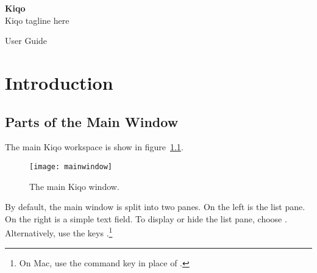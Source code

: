 \documentclass[11pt,fleqn]{book} %
\begin{document}

\begingroup
\thispagestyle{empty}
\centering
\vspace*{5cm}
\par\normalfont\fontsize{35}{35}\sffamily\selectfont
\textbf{Kiqo}\\
{\LARGE Kiqo tagline here}\par %
\vspace*{1cm}
{\Huge User Guide}\par %
\endgroup


\thispagestyle{empty}
\tableofcontents %


\chapter{Introduction}
\thispagestyle{empty}

\section{Parts of the Main Window}
The main Kiqo workspace is show in figure~\ref{fig:mainwindow}.

\begin{figure}[h]
  \centering
  \texttt{[image: mainwindow]}
  \caption{The main Kiqo window.\label{fig:mainwindow}}
\end{figure}

By default, the main window is split into two panes.
On the left is the list pane.
On the right is a simple text field.
To display or hide the list pane, choose .
Alternatively, use the keys .\footnote{On Mac,
use the command key \keys{\cmd} in place of \keys{\ctrl}.}
\end{document}
